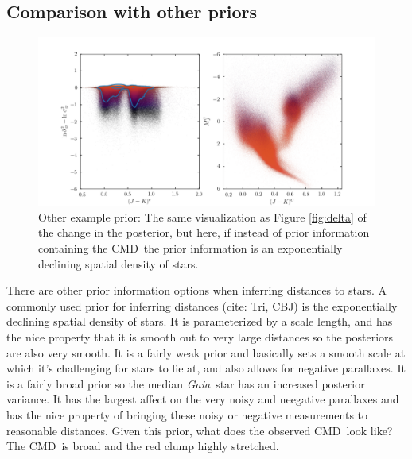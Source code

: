\documentclass[modern]{aastex61}
\newcommand{\acronym}[1]{{\small{#1}}}
\newcommand{\project}[1]{\textsl{#1}}
\newcommand{\gaia}{\project{Gaia}}
\newcommand{\cmd}{\acronym{CMD}}
\begin{document}
\subsection{Comparison with other priors}
\begin{figure}
\centering
  \includegraphics[width=\textwidth]{deltaSimple.png}
\caption{Other example prior: The same visualization as Figure \ref{fig:delta} of the change in the posterior, but here, if instead of prior information containing the \cmd\, the prior information is an exponentially declining spatial density of stars.  }
\label{fig:otherPrior}
\end{figure}

There are other prior information options when inferring distances to stars. A commonly used prior for inferring distances (cite: Tri, CBJ) is the exponentially declining spatial density of stars. It is parameterized by a scale length, and has the nice property that it is smooth out to very large distances so the posteriors are also very smooth. It is a fairly weak prior and basically sets a smooth scale at which it's challenging for stars to lie at, and also allows for negative parallaxes. It is a fairly broad prior so the median \gaia\ star has an increased posterior variance. It has the largest affect on the very noisy and neegative parallaxes and has the nice property of bringing these noisy or negative measurements to reasonable distances. Given this prior, what does the observed \cmd\ look like?  The \cmd\ is broad and the red clump highly stretched.
\end{document}
